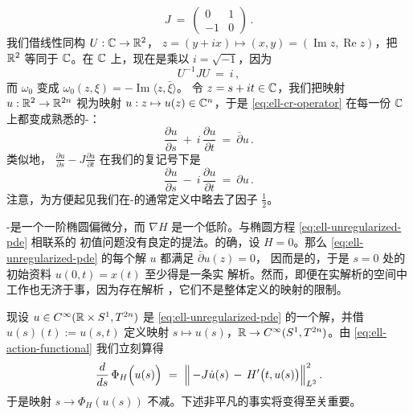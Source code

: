 \begin{equation}\label{eq:ell-j-matrix}
J\ =\ \begin{pmatrix} 0 & 1 \\ -1 & 0 \end{pmatrix}\,.
\end{equation}
我们借线性同构 $U:\mathbb{C}\to\mathbb{R}^{2}$，%
$z=(y+ix)\mapsto(x,y)=(\operatorname{Im}z,\operatorname{Re}z)$，把 $\mathbb{R}^{2}$%
等同于 $\mathbb{C}$。在 $\mathbb{C}$ 上，\trComplexStructure{}现在是乘以 $i=\sqrt{-1}$，因为
\begin{equation}\label{eq:ell-ujui}
U^{-1}JU\ =\ i\,,
\end{equation}
而 $\omega_{0}$ 变成 $\omega_{0}(z,\xi)=-\operatorname{Im}\langle z,\bar{\xi}\rangle$。%
令 $z=s+it\in\mathbb{C}$，我们把映射 $u:\mathbb{R}^{2}\to\mathbb{R}^{2n}$ 视为映射%
$u:z\mapsto u(z)\in\mathbb{C}^{n}$，于是\trOperator{} \eqref{eq:ell-cr-operator} 在每一份%
$\mathbb{C}$ 上都变成熟悉的\trCauchy-\trRiemann\trOperator：
\begin{equation}\label{eq:ell-dbar-u}
\frac{\partial u}{\partial s}\ +\ i\,\frac{\partial u}{\partial t}\ =\ \bar{\partial}u\,.
\end{equation}
类似地，\trOperator{} $\frac{\partial u}{\partial s}-J\frac{\partial u}{\partial t}$%
在我们的复记号下是\trOperator
\begin{equation}\label{eq:ell-partial-u}
\frac{\partial u}{\partial s}\ -\ i\,\frac{\partial u}{\partial t}\ =\ \partial u\,.
\end{equation}
注意，为方便起见我们在\trCauchy-\trRiemann\trOperator{}的通常定义中略去了因子%
$\frac{1}{2}$。

\trCauchy-\trRiemann\trOperator{}是一个一阶椭圆偏微分\trOperator，而 $\nabla H$%
是一个低阶\trPerturbation。与椭圆方程 \eqref{eq:ell-unregularized-pde} 相联系的%
初值问题没有良定的提法。的确，设 $H=0$。那么%
\eqref{eq:ell-unregularized-pde} 的每个解 $u$ 都满足 $\bar{\partial}u(z)=0$，%
因而是\trHolomorphic{}的，于是 $s=0$ 处的初始资料 $u(0,t)=x(t)$ 至少得是一条实%
解析\trLoop。然而，即便在实解析\trLoop{}的空间中工作也无济于事，因为存在解析%
\trLoop，它们不是整体定义的\trHolomorphic{}映射的限制。

现设 $u\in C^{\infty}(\mathbb{R}\times S^{1},T^{2n})$ 是\trPartialDifferentialEquation%
\eqref{eq:ell-unregularized-pde} 的一个解，并借 $u(s)(t):=u(s,t)$ 定义映射%
$s\mapsto u(s)$，$\mathbb{R}\to C^{\infty}(S^{1},T^{2n})$。由%
\eqref{eq:ell-action-functional} 我们立刻算得
\begin{equation}\label{eq:ell-action-derivative}
\frac{d}{ds}\,\Phi_{H}\Bigl(u(s)\Bigr)\ =\ \Bigl\|\,-J\dot{u}(s)\,-\,H'\bigl(t,u(s)\bigr)\Bigr\|^{2}_{L^{2}}\,.
\end{equation}
于是映射 $s\to\Phi_{H}(u(s))$ 不减。下述非平凡的事实将变得至关重要。

